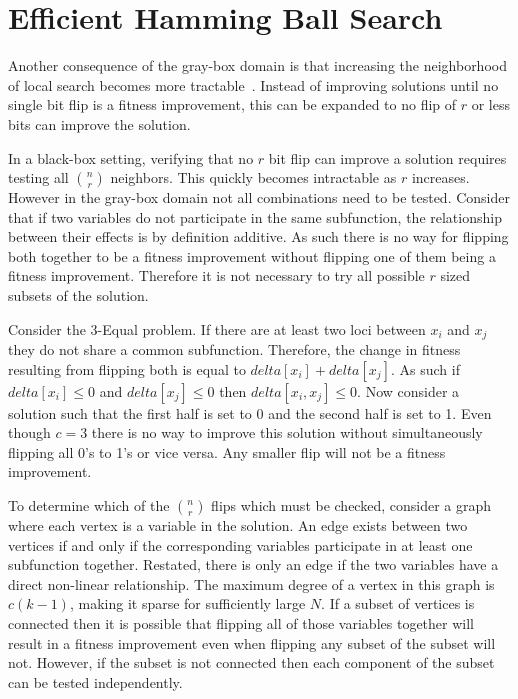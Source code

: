 \section{Efficient Hamming Ball Search}
\label{sec-hamming}
Another consequence of the gray-box domain is that increasing the neighborhood of local search becomes
more tractable~\cite{chicano:2014:ball}.  Instead of improving solutions until no single bit flip
is a fitness improvement, this can be expanded to no flip of $r$ or less bits can improve the solution.

In a black-box setting, verifying that no $r$ bit flip can improve a solution requires testing all
$n \choose r$ neighbors. This quickly becomes intractable as $r$ increases. However in the gray-box
domain not all combinations need to be tested. Consider that if two variables do not participate
in the same subfunction, the relationship between their effects is by definition additive. As such
there is no way for flipping both together to be a fitness improvement without flipping one of them
being a fitness improvement. Therefore it is not necessary to try all possible $r$ sized subsets
of the solution.

Consider the 3-Equal problem.  If there are at least two loci between $x_i$ and $x_j$ they do
not share a common subfunction. Therefore, the change in fitness resulting from flipping
both is equal to $delta[x_i] + delta[x_j]$. As such if $delta[x_i] \leq 0$ and $delta[x_j] \leq 0$
then $delta[x_i,x_j] \leq 0$. Now consider a solution such that the first half is set to 0
and the second half is set to 1. Even though $c=3$ there is no way to improve this solution without
simultaneously flipping all 0's to 1's or vice versa. Any smaller flip will not
be a fitness improvement.

To determine which of the $n \choose r$ flips which must be checked, consider a graph where
each vertex is a variable in the solution. An edge exists between two vertices if and only
if the corresponding variables participate in at least one subfunction together. Restated,
there is only an edge if the two variables have a direct non-linear relationship. The maximum
degree of a vertex in this graph is $c(k-1)$, making it sparse for sufficiently large $N$.
If a subset of vertices is connected then it is possible that flipping all of those
variables together will result in a fitness improvement even when flipping any subset
of the subset will not. However, if the subset is not connected then each component
of the subset can be tested independently.

